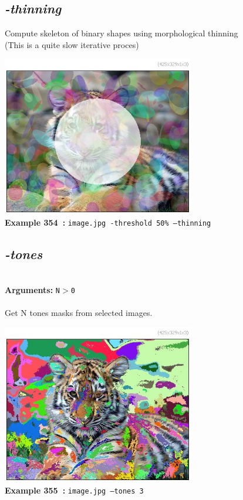\documentclass[a4paper,11pt,twoside]{book}
\begin{document}
\subsection{\emph{-thinning} }\vspace*{-0.5em}
Compute skeleton of binary shapes using morphological thinning
~\\(This is a quite slow iterative proces)
\begin{center}\includegraphics[keepaspectratio=true,height=7cm,width=\textwidth]{img/gmic_def354.jpg}\\
{\footnotesize \textbf{Example 354~:} \texttt{image.jpg -threshold 50\% --thinning}}
\end{center}

\subsection{\emph{-tones} }\vspace*{-0.5em}
~\\\textbf{Arguments: } 
{\small \texttt{N$>$0}}\\~\\
Get N tones masks from selected images.
\begin{center}\includegraphics[keepaspectratio=true,height=7cm,width=\textwidth]{img/gmic_def355.jpg}\\
{\footnotesize \textbf{Example 355~:} \texttt{image.jpg --tones 3}}
\end{center}
\end{document}

